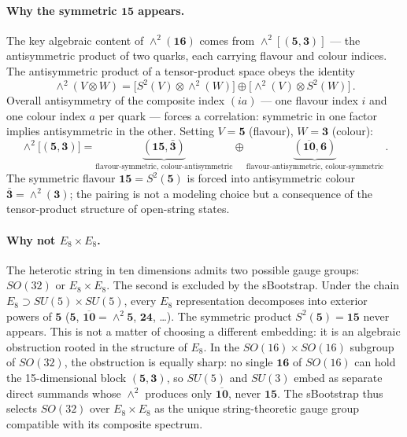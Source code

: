 \documentclass[12pt,a4paper]{article}
\begin{document}
\paragraph{Why the symmetric $\mathbf{15}$ appears.}
The key algebraic content of $\wedge^2(\mathbf{16})$ comes from
$\wedge^2[(\mathbf{5},\mathbf{3})]$ --- the antisymmetric product
of two quarks, each carrying flavour and colour indices.
The antisymmetric product of a tensor-product space obeys the identity
\begin{equation}\label{eq:wedge-identity}
  \wedge^2(V \otimes W)
  = \bigl[S^2(V) \otimes \wedge^2(W)\bigr]
  \oplus \bigl[\wedge^2(V) \otimes S^2(W)\bigr]\,.
\end{equation}
Overall antisymmetry of the composite index $(ia)$ --- one flavour
index $i$ and one colour index $a$ per quark --- forces a correlation:
symmetric in one factor implies antisymmetric in the other.
Setting $V = \mathbf{5}$ (flavour), $W = \mathbf{3}$ (colour):
\begin{equation}
  \wedge^2\bigl[(\mathbf{5},\mathbf{3})\bigr]
  = \underbrace{(\mathbf{15},\bar{\mathbf{3}})}_{\text{flavour-symmetric,
    colour-antisymmetric}}
  \oplus \underbrace{(\overline{\mathbf{10}},\mathbf{6})}_{\text{flavour-antisymmetric,
    colour-symmetric}}\,.
\end{equation}
The symmetric flavour $\mathbf{15} = S^2(\mathbf{5})$ is forced into
antisymmetric colour $\bar{\mathbf{3}} = \wedge^2(\mathbf{3})$; the
pairing is not a modeling choice but a consequence of the tensor-product
structure of open-string states.

\paragraph{Why not $E_8 \times E_8$.}
The heterotic string in ten dimensions admits two possible gauge groups:
$SO(32)$ or $E_8 \times E_8$.  The second is excluded by the
sBootstrap.  Under the chain $E_8 \supset SU(5) \times SU(5)$,
every $E_8$ representation decomposes into exterior powers
of $\mathbf{5}$ ($\mathbf{5}$, $\overline{\mathbf{10}} =
\wedge^2\mathbf{5}$, $\mathbf{24}$, \ldots).  The symmetric product
$S^2(\mathbf{5}) = \mathbf{15}$ never appears.
This is not a matter of choosing a different embedding: it is an
algebraic obstruction rooted in the structure of $E_8$.  In the
$SO(16) \times SO(16)$ subgroup of $SO(32)$, the obstruction is
equally sharp: no single $\mathbf{16}$ of $SO(16)$ can hold the
15-dimensional block $(\mathbf{5},\mathbf{3})$, so $SU(5)$ and
$SU(3)$ embed as separate direct summands whose $\wedge^2$ produces
only $\overline{\mathbf{10}}$, never $\mathbf{15}$.
The sBootstrap thus selects $SO(32)$ over $E_8 \times E_8$ as the
unique string-theoretic gauge group compatible with its composite
spectrum.
\end{document}
